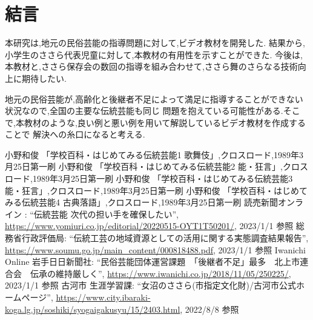\documentclass[12pt]{ltjsarticle}
\begin{document}
\newpage
\section{結言}
本研究は,地元の民俗芸能の指導問題に対して,ビデオ教材を開発した.
結果から,小学生のささら代表児童に対して,本教材の有用性を示すことができた.
今後は,本教材と,ささら保存会の数回の指導を組み合わせて,ささら舞のさらなる技術向上に期待したい.

地元の民俗芸能が,高齢化と後継者不足によって満足に指導することができない状況なので,全国の主要な伝統芸能も同じ
問題を抱えている可能性がある.そこで,本教材のような,良い例と悪い例を用いて解説しているビデオ教材を作成することで
解決への糸口になると考える.

\begin{thebibliography}{99}
 小野和俊 「学校百科・はじめてみる伝統芸能1 歌舞伎」,クロスロード,1989年3月25日第一刷
 小野和俊 「学校百科・はじめてみる伝統芸能2 能・狂言」,クロスロード,1989年3月25日第一刷
 小野和俊 「学校百科・はじめてみる伝統芸能3 能・狂言」,クロスロード,1989年3月25日第一刷
 小野和俊 「学校百科・はじめてみる伝統芸能4 古典落語」,クロスロード,1989年3月25日第一刷
 読売新聞オンライン : ``伝統芸能 次代の担い手を確保したい'', \url{https://www.yomiuri.co.jp/editorial/20220515-OYT1T50201/}, 2023/1/1 参照
 総務省行政評価局: ``伝統工芸の地域資源としての活用に関する実態調査結果報告'', \url{https://www.soumu.go.jp/main_content/000818488.pdf}, 2023/1/1 参照  
 Iwanichi Online 岩手日日新聞社: ``民俗芸能団体運営課題　「後継者不足」最多　北上市連合会　伝承の維持厳しく'', \url{https://www.iwanichi.co.jp/2018/11/05/250225/}, 2023/1/1 参照
 古河市 生涯学習課: ``女沼のささら(市指定文化財)/古河市公式ホームページ'', \url{https://www.city.ibaraki-koga.lg.jp/soshiki/syogaigakusyu/15/2403.html}, 2022/8/8 参照



\end{thebibliography}
\end{document}

